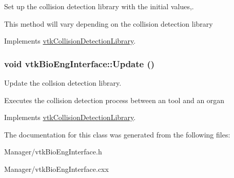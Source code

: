 Set up the collision detection library with the initial values,. 

This method will vary depending on the collision detection library 

Implements \hyperlink{classvtkCollisionDetectionLibrary_ac29256d189958f001608f8f5d170a73c}{vtkCollisionDetectionLibrary}.

\hypertarget{classvtkBioEngInterface_af04a067b7a6f524faa7ff14552147260}{
\subsubsection[{Update}]{\setlength{\rightskip}{0pt plus 5cm}void vtkBioEngInterface::Update ()}}
\label{classvtkBioEngInterface_af04a067b7a6f524faa7ff14552147260}


Update the collsion detection library. 

Executes the collision detection process between an tool and an organ 

Implements \hyperlink{classvtkCollisionDetectionLibrary_ae3ce4d5055eee783a8bf9f06f62f5667}{vtkCollisionDetectionLibrary}.



The documentation for this class was generated from the following files:\begin{DoxyCompactItemize}
\item 
Manager/vtkBioEngInterface.h\item 
Manager/vtkBioEngInterface.cxx\end{DoxyCompactItemize}
